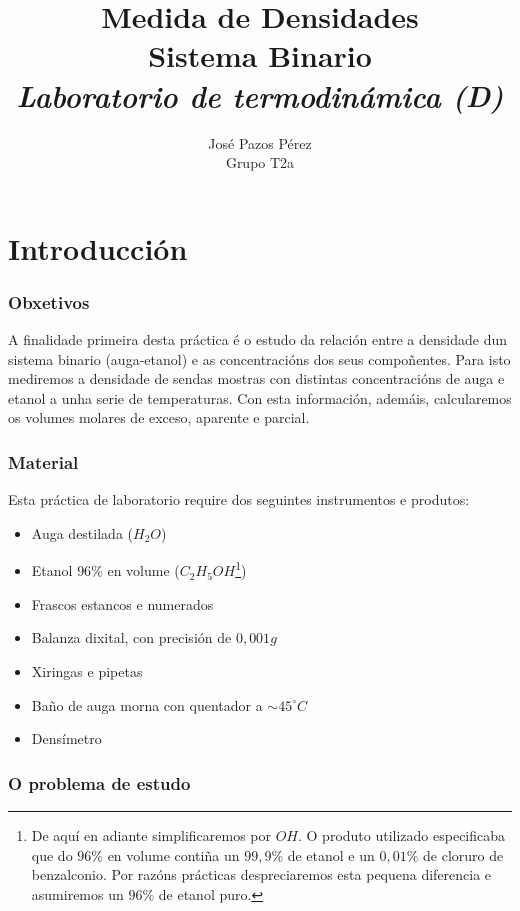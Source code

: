 \documentclass[12pt, a4paper, titlepage]{article}
\title{\textbf{\Huge{Medida de Densidades}\\\LARGE{Sistema Binario}}\\\textbf{\large \textit{Laboratorio de termodinámica (D)}}}
\author{{\Large José Pazos Pérez}\\Grupo T2a}
\date{}
\begin{document}
  \maketitle

  \tableofcontents



  \newpage
  \part{Introducción}

  \section{Obxetivos}

  A finalidade primeira desta práctica é o estudo da relación entre a densidade dun sistema binario (auga-etanol) e as concentracións dos seus compoñentes.
  Para isto mediremos a densidade de sendas mostras con distintas concentracións de auga e etanol a unha serie de temperaturas.
  Con esta información, ademáis, calcularemos os volumes molares de exceso, aparente e parcial.

  \section{Material}

  Esta práctica de laboratorio require dos seguintes instrumentos e produtos:

  \begin{itemize}
    \setlength\itemsep{-4pt}
    \item Auga destilada ($H_2O$)
    \item Etanol $96\%$ en volume ($C_2H_5OH$\footnote{De aquí en adiante simplificaremos por $OH$. O produto utilizado especificaba que do $96\%$ en volume contiña un $99,9\%$ de etanol e un $0,01\%$ de cloruro de benzalconio. Por razóns prácticas despreciaremos esta pequena diferencia e asumiremos un $96\%$ de etanol puro.})
    \item Frascos estancos e numerados
    \item Balanza dixital, con precisión de $0,001g$
    \item Xiringas e pipetas
    \item Baño de auga morna con quentador a $\sim 45 ^\circ C$
    \item Densímetro
  \end{itemize}

  \newpage
  \section{O problema de estudo}
\end{document}
